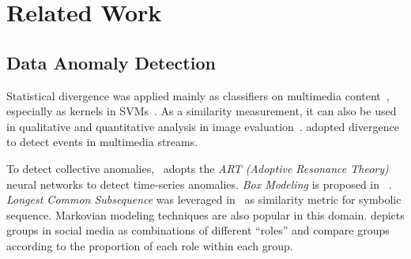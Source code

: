 \documentclass{article}
\begin{document}
	\section{Related Work}\label{sec:related-work}
		\subsection{Data Anomaly Detection}
			Statistical divergence was applied mainly as classifiers on multimedia content~\cite{park2005classification}, especially as kernels in SVMs~\cite{moreno2004kullback}. As a similarity measurement, it can also be used in qualitative and quantitative analysis in image evaluation~\cite{pheng2016kullback,goldberger2003efficient}. \cite{amid2014unsupervised} adopted divergence to detect events in multimedia streams.
			
			
			
			To detect collective anomalies,~\cite{caudell1993adaptive} adopts the \textit{ART (Adoptive Resonance Theory)} neural networks to detect time-series anomalies. \textit{Box Modeling} is proposed in ~\cite{chan2005modeling}. \textit{Longest Common Subsequence} was leveraged in~\cite{budalakoti2006anomaly} as similarity metric for symbolic sequence. Markovian modeling techniques are also popular in this domain\cite{ye2000markov,warrender1999detecting,pavlov2003sequence}. \cite{yu2015glad} depicts groups in social media as combinations of different ``roles'' and compare groups according to the proportion of each role within each group.
			
\end{document}
